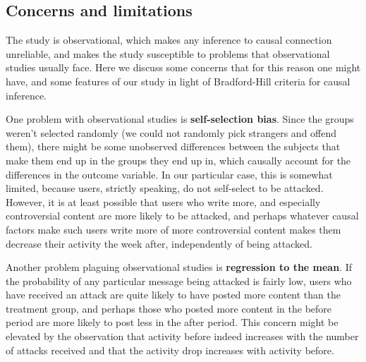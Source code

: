 \documentclass[10pt,dvipsnames]{scrartcl}
\begin{document}
\subsection{Concerns and limitations}

The study is observational, which makes any inference to causal
connection unreliable, and makes the study susceptible to problems that
observational studies usually face. Here we discuss some concerns that
for this reason one might have, and some features of our study in light
of Bradford-Hill criteria for causal inference.

One problem with observational studies is \textbf{self-selection bias}.
Since the groups weren't selected randomly (we could not randomly pick
strangers and offend them), there might be some unobserved differences
between the subjects that make them end up in the groups they end up in,
which causally account for the differences in the outcome variable. In
our particular case, this is somewhat limited, because users, strictly
speaking, do not self-select to be attacked. However, it is at least
possible that users who write more, and especially controversial content
are more likely to be attacked, and perhaps whatever causal factors make
such users write more of more controversial content makes them decrease
their activity the week after, independently of being attacked.

Another problem plaguing observational studies is
\textbf{regression to the mean}. If the probability of any particular
message being attacked is fairly low, users who have received an attack
are quite likely to have posted more content than the treatment group,
and perhaps those who posted more content in the \textsf{before} period
are more likely to post less in the \textsf{after} period. This concern
might be elevated by the observation that activity before indeed
increases with the number of attacks received and that the activity drop
increases with \textsf{activity} before.
\end{document}
